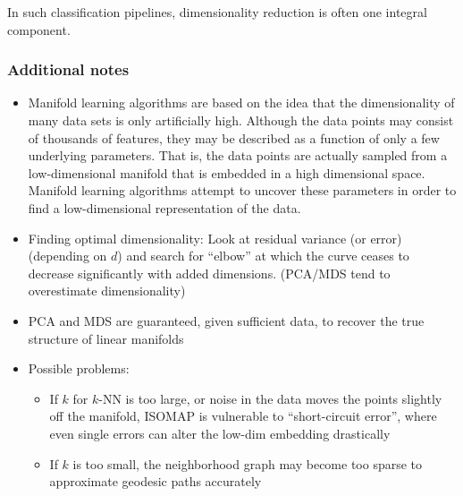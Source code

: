 In such classification pipelines, dimensionality reduction is often one integral component.

\subsubsection{Additional notes}
\begin{itemize}
    \item Manifold learning algorithms are based on the idea that the dimensionality of many data sets is only artificially high. Although the data points may consist of thousands of features, they may be described as a function of only a few underlying parameters. That is, the data points are actually sampled from a low-dimensional manifold that is embedded in a high dimensional space. Manifold learning algorithms attempt to uncover these parameters in order to find a low-dimensional representation of the data.
    \item Finding optimal dimensionality: Look at residual variance (or error) (depending on \(d\)) and search for ``elbow'' at which the curve ceases to decrease significantly with added dimensions. (PCA/MDS tend to overestimate dimensionality)
    \item PCA and MDS are guaranteed, given sufficient data, to recover the true structure of linear manifolds
    \item Possible problems:

        \begin{itemize}
            \item If \(k\) for \(k\)-NN is too large, or noise in the data moves the points slightly off the manifold, ISOMAP is vulnerable to ``short-circuit error'', where even single errors can alter the low-dim embedding drastically
            \item If \(k\) is too small, the neighborhood graph may become too sparse to approximate geodesic paths accurately
        \end{itemize}

\end{itemize}
